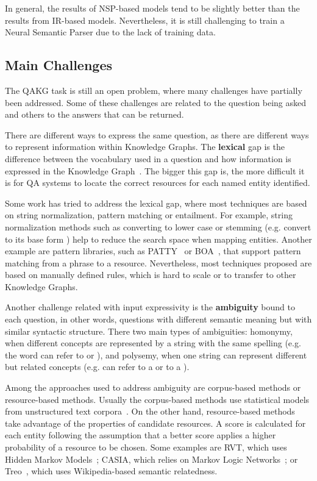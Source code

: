 In general, the results of NSP-based models tend to be slightly better than the results from 
IR-based models. Nevertheless, it is still challenging to train a Neural Semantic Parser due to 
the lack of training data.

\subsection{Main Challenges}
\label{cap2:qakg/challenges}
The QAKG task is still an open problem, where many challenges have partially been addressed. 
Some of these challenges are related to the question being asked and others to the answers that 
can be returned. 

There are different ways to express the same question, as there are different ways to represent 
information within Knowledge Graphs. The \textbf{lexical} gap is the difference between the 
vocabulary used in a question and how information is expressed in the Knowledge 
Graph~\cite{semPar:lexical-gap-HakimovUWC15}. The bigger this gap is, the more difficult it is 
for QA systems to locate the correct resources for each named entity identified. 

Some work has tried to address the lexical gap, where most techniques are based on string 
normalization, pattern matching or entailment. For example, string normalization methods such 
as converting to lower case or stemming (e.g. convert  to its base form 
) help to reduce the search space when mapping entities. Another example are 
pattern libraries, such as PATTY~\cite{qa:NakasholeWS12} or BOA~\cite{qa:GerberN12}, that 
support pattern matching from a phrase to a resource. Nevertheless, most techniques proposed 
are based on manually defined rules, which is hard to scale or to transfer to other Knowledge 
Graphs.

Another challenge related with input expressivity is the \textbf{ambiguity} bound to each 
question, in other words, questions with different semantic meaning but with similar syntactic 
structure. There two main types of ambiguities: homonymy, when different concepts are 
represented by a string with the same spelling (e.g. the word  can refer to 
 or ), and polysemy, when one string can 
represent different but related concepts (e.g.  can refer to a 
 or to a ). 

Among the approaches used to address ambiguity are corpus-based methods or resource-based 
methods. Usually the corpus-based methods use statistical models from unstructured text 
corpora~\cite{qa:shirai1997,qa:ShenYYJLC11}. On the other hand, resource-based methods take 
advantage of the \RDF{} properties of candidate resources. A score is calculated for each entity 
following the assumption that a better score applies a higher probability of a resource to be 
chosen. Some examples are RVT, which uses Hidden Markov Models~\cite{qa:GiannoneBB13}; CASIA, 
which relies on Markov Logic Networks~\cite{qa:shizhu2014casia}; or Treo~\cite{qa:freitas2011treo,
qa:FreitasOOSC13}, which uses Wikipedia-based semantic relatedness.


